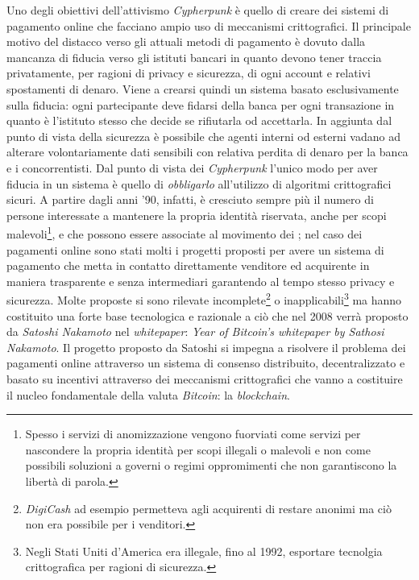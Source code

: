 Uno degli obiettivi dell'attivismo \textit{Cypherpunk} è quello di creare dei sistemi di pagamento online che facciano ampio uso di meccanismi crittografici. Il principale motivo del distacco verso gli attuali metodi di pagamento è dovuto dalla mancanza di fiducia verso gli istituti bancari in quanto devono tener traccia privatamente, per ragioni di privacy e sicurezza, di ogni account e relativi spostamenti di denaro. Viene a crearsi quindi un sistema basato esclusivamente sulla fiducia: ogni partecipante deve fidarsi della banca per ogni transazione in quanto è l'istituto stesso che decide se rifiutarla od accettarla. In aggiunta dal punto di vista della sicurezza è possibile che agenti interni od esterni vadano ad alterare volontariamente dati sensibili con relativa perdita di denaro per la banca e i concorrentisti. Dal punto di vista dei \textit{Cypherpunk} l'unico modo per aver fiducia in un sistema è quello di \textit{obbligarlo} all'utilizzo di algoritmi crittografici sicuri.\newline\newline
A partire dagli anni '90, infatti, è cresciuto sempre più il numero di persone interessate a mantenere la propria identità riservata, anche per scopi malevoli\footnote{Spesso i servizi di anomizzazione vengono fuorviati come servizi per nascondere la propria identità per scopi illegali o malevoli e non come possibili soluzioni a governi o regimi oppromimenti che non garantiscono la libertà di parola.}, e che possono essere associate al movimento dei ; nel caso dei pagamenti online sono stati molti i progetti proposti per avere un sistema di pagamento che metta in contatto direttamente venditore ed acquirente in maniera trasparente e senza intermediari garantendo al tempo stesso privacy e sicurezza. Molte proposte si sono rilevate incomplete\footnote{\textit{DigiCash} ad esempio permetteva agli acquirenti di restare anonimi ma ciò non era possibile per i venditori.} o inapplicabili\footnote{Negli Stati Uniti d'America era illegale, fino al 1992, esportare tecnolgia crittografica per ragioni di sicurezza.} ma hanno costituito una forte base tecnologica e razionale a ciò che nel 2008 verrà proposto da \textit{Satoshi Nakamoto} nel \textit{whitepaper}: \textit{Year of Bitcoin's whitepaper by Sathosi Nakamoto}.\newline\newline
Il progetto proposto da Satoshi si impegna a risolvere il problema dei pagamenti online attraverso un sistema di consenso distribuito, decentralizzato e basato su incentivi attraverso dei meccanismi crittografici che vanno a costituire il nucleo fondamentale della valuta \textit{Bitcoin}: la \textit{blockchain}.\newline

